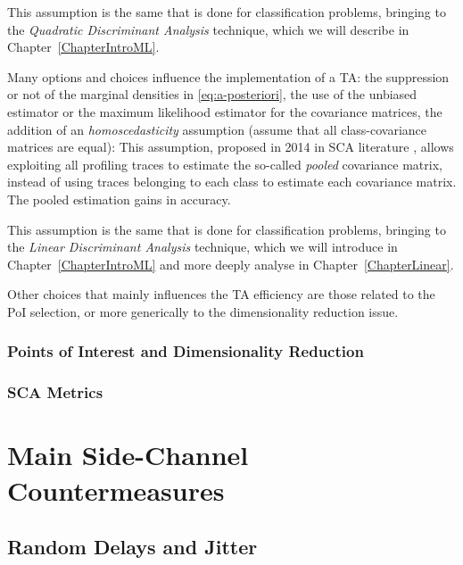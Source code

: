 \begin{remark}This assumption is the same that is done for classification problems, bringing to the \emph{Quadratic Discriminant Analysis} technique, which we will describe in Chapter~\ref{ChapterIntroML}. 
\end{remark}

Many options and choices influence the implementation of a TA: the suppression or not of the marginal densities in \eqref{eq:a-posteriori}, the use of the unbiased estimator or the maximum likelihood estimator for the covariance matrices, the addition of an \emph{homoscedasticity} assumption (assume that all class-covariance matrices are equal): This assumption, proposed in 2014 in SCA literature \cite{choudary2014efficient},  allows exploiting all profiling traces to estimate the so-called \emph{pooled} covariance matrix, instead of using traces belonging to each class to estimate each covariance matrix. The pooled estimation gains in accuracy. 

\begin{remark}
This assumption is the same that is done for classification problems, bringing to the \emph{Linear Discriminant Analysis} technique, which we will introduce in Chapter~\ref{ChapterIntroML} and more deeply analyse in Chapter~\ref{ChapterLinear}.  
\end{remark}

Other choices that mainly influences the TA efficiency are those related to the PoI selection, or more generically to the dimensionality reduction issue.

\subsubsection{Points of Interest and Dimensionality Reduction}


\subsubsection{SCA Metrics}



\section{Main Side-Channel Countermeasures}
\subsection{Random Delays and Jitter}
